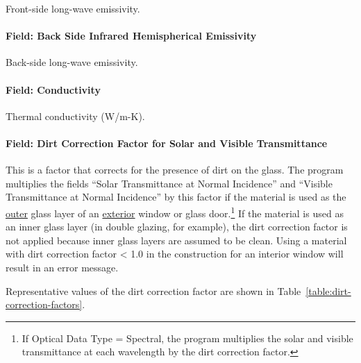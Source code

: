 Front-side long-wave emissivity.

\paragraph{Field: Back Side Infrared Hemispherical Emissivity}\label{field-back-side-infrared-hemispherical-emissivity}

Back-side long-wave emissivity.

\paragraph{Field: Conductivity}\label{field-conductivity-1}

Thermal conductivity (W/m-K).

\paragraph{Field: Dirt Correction Factor for Solar and Visible Transmittance}\label{field-dirt-correction-factor-for-solar-and-visible-transmittance}

This is a factor that corrects for the presence of dirt on the glass. The program multiplies the fields ``Solar Transmittance at Normal Incidence'' and ``Visible Transmittance at Normal Incidence'' by this factor if the material is used as the \underline{outer} glass layer of an \underline{exterior} window or glass door.\footnote{If Optical Data Type = Spectral, the program multiplies the solar and visible transmittance at each wavelength by the dirt correction factor.} If the material is used as an inner glass layer (in double glazing, for example), the dirt correction factor is not applied because inner glass layers are assumed to be clean. Using a material with dirt correction factor \textless{} 1.0 in the construction for an interior window will result in an error message.

Representative values of the dirt correction factor are shown in Table~\ref{table:dirt-correction-factors}.

